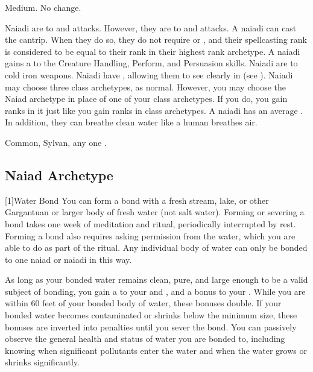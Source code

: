    Medium.
   No change.
  \begin{raggeditemize}
     Naiadi are \impervious to \atFire and \atWater attacks.
      However, they are \vulnerable to \atCold and \atElectricity attacks.
     A naiadi can cast the  cantrip.
      When they do so, they do not require  or , and their spellcasting rank is considered to be equal to their rank in their highest rank archetype.
     A naiadi gains a   to the Creature Handling, Perform, and Persuasion skills.
     Naiadi are \vulnerable to cold iron weapons.
     Naiadi have , allowing them to see clearly in  (see ).
     Naiadi may choose three class archetypes, as normal.
      However, you may choose the Naiad archetype in place of one of your class archetypes.
      If you do, you gain ranks in it just like you gain ranks in class archetypes.
     A naiadi has an average .
      In addition, they can breathe clean water like a human breathes air.
  \end{raggeditemize}
   Common, Sylvan, any one .

  \subsection{Naiad Archetype}

    [1]{Water Bond} You can form a bond with a fresh stream, lake, or other Gargantuan or larger body of fresh water (not salt water).
      Forming or severing a bond takes one week of meditation and ritual, periodically interrupted by rest.
      Forming a bond also requires asking permission from the water, which you are able to do as part of the ritual.
      Any individual body of water can only be bonded to one naiad or naiadi in this way.

      As long as your bonded water remains clean, pure, and large enough to be a valid subject of bonding, you gain a   to your  and , and a  bonus to your .
      While you are within 60 feet of your bonded body of water, these bonuses double.
      If your bonded water becomes contaminated or shrinks below the minimum size, these bonuses are inverted into penalties until you sever the bond.
      You can passively observe the general health and status of water you are bonded to, including knowing when significant pollutants enter the water and when the water grows or shrinks significantly.

